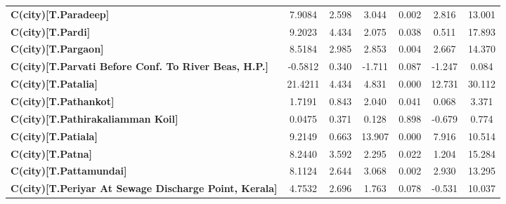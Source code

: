 \begin{center}
\begin{tabular}{lcccccc}
\textbf{C(city)[T.Paradeep]}                                                                        &       7.9084  &        2.598     &     3.044  &         0.002        &        2.816    &       13.001     \\
\textbf{C(city)[T.Pardi]}                                                                           &       9.2023  &        4.434     &     2.075  &         0.038        &        0.511    &       17.893     \\
\textbf{C(city)[T.Pargaon]}                                                                         &       8.5184  &        2.985     &     2.853  &         0.004        &        2.667    &       14.370     \\
\textbf{C(city)[T.Parvati Before Conf. To River Beas, H.P.]}                                        &      -0.5812  &        0.340     &    -1.711  &         0.087        &       -1.247    &        0.084     \\
\textbf{C(city)[T.Patalia]}                                                                         &      21.4211  &        4.434     &     4.831  &         0.000        &       12.731    &       30.112     \\
\textbf{C(city)[T.Pathankot]}                                                                       &       1.7191  &        0.843     &     2.040  &         0.041        &        0.068    &        3.371     \\
\textbf{C(city)[T.Pathirakaliamman Koil]}                                                           &       0.0475  &        0.371     &     0.128  &         0.898        &       -0.679    &        0.774     \\
\textbf{C(city)[T.Patiala]}                                                                         &       9.2149  &        0.663     &    13.907  &         0.000        &        7.916    &       10.514     \\
\textbf{C(city)[T.Patna]}                                                                           &       8.2440  &        3.592     &     2.295  &         0.022        &        1.204    &       15.284     \\
\textbf{C(city)[T.Pattamundai]}                                                                     &       8.1124  &        2.644     &     3.068  &         0.002        &        2.930    &       13.295     \\
\textbf{C(city)[T.Periyar At Sewage Discharge Point, Kerala]}                                       &       4.7532  &        2.696     &     1.763  &         0.078        &       -0.531    &       10.037     \\

\end{tabular}
\end{center}
